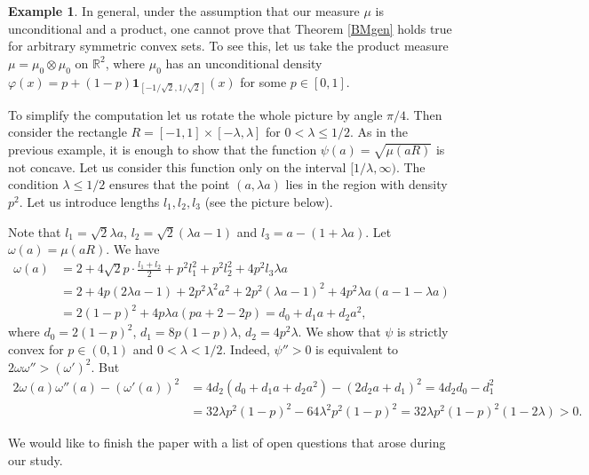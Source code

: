 \documentclass[11pt]{article}
\newcommand{\mb}[1]{\mathbb{{#1}}}
\newcommand{\1}{\mathbf{{1}}}
\newcommand{\vp}{\varphi}
\theoremstyle{definition}
\newtheorem{ex}{Example}
\begin{document}
\begin{ex}\label{ex2}
In general, under the assumption that our measure $\mu$ is unconditional and a product, one cannot prove that Theorem \ref{BMgen} holds true for arbitrary symmetric convex sets.
To see this, let us take the product measure $\mu=\mu_0 \otimes \mu_0$ on $\mb{R}^2$, where $\mu_0$ has an unconditional density $\vp(x)=p+(1-p)\1_{[-1/\sqrt{2},1/\sqrt{2}]}(x)$ for some $p \in [0,1]$.

To simplify the computation let us rotate the whole picture by angle $\pi/4$. Then consider the rectangle $R=[-1,1] \times [-\lambda , \lambda ]$ for $0 < \lambda \leq 1/2$. As in the previous example, it is enough to show that the function $\psi(a)=\sqrt{\mu(aR)}$ is not concave. Let us consider this function only on the interval $[1/ \lambda,\infty)$. The condition $\lambda \leq 1/2$ ensures that the point $(a,\lambda a)$ lies in the region with density $p^2$. Let us introduce lengths $l_1,l_2,l_3$ (see the picture below).


\begin{figure}[h!]
\centering
\def\svgwidth{230pt}
%

\end{figure}
\end{ex}


\noindent Note that $l_1=\sqrt{2}\lambda a$, $l_2=\sqrt{2}(\lambda a-1)$ and $l_3=a-(1+\lambda a)$. Let $\omega(a)=\mu(aR)$. We have
\begin{align*}
	\omega(a) & = 2+4\sqrt{2}p \cdot \frac{l_1+l_2}{2} + p^2l_1^2 + p^2l_2^2 + 4p^2l_3 \lambda a \\ &  = 2+4p(2\lambda a -1) + 2p^2 \lambda^2 a^2  + 2p^2(\lambda a -1)^2 + 4p^2 \lambda a(a-1-\lambda a) \\
	& = 2(1-p)^2 + 4p\lambda a(pa+2-2p)=d_0+d_1a+d_2a^2,
\end{align*}
where $d_0=2(1-p)^2$, $d_1=8p(1-p)\lambda$, $d_2=4p^2\lambda$.
We show that $\psi$ is strictly convex for $p \in (0,1)$ and $0<\lambda<1/2$.  Indeed, $\psi''>0$ is equivalent to $2\omega \omega'' > (\omega')^2$. But
\begin{align*}
	2\omega(a) \omega''(a) - (\omega'(a))^2 & = 4 d_2(d_0+d_1a+d_2a^2) -  (2d_2 a+d_1)^2 = 4d_2d_0-d_1^2 \\
	& = 32\lambda p^2(1-p)^2 - 64\lambda^2 p^2(1-p)^2 = 32 \lambda p^2(1-p)^2(1-2\lambda)>0.
\end{align*}




We would like to finish the paper with a list of open questions that arose during our study.
\end{document}
